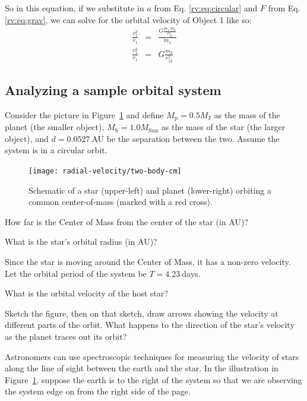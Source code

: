 So in this equation, if we substitute in $a$ from Eq. \ref{rv:eq:circular} and $F$ from Eq. \ref{rv:eq:grav}, we can solve for the orbital velocity of Object 1 like so:
\begin{eqnarray}
 \frac{v_1^2}{r_1} &=& \frac{G \frac{m_1 \: m_2}{r_{12}^2}}{m_1} \\
 \frac{v_1^2}{r_1} &=& G \frac{m_2}{r_{12}^2}
\end{eqnarray}

\subsection{Analyzing a sample orbital system}

Consider the picture in Figure~\ref{rv:fig:two-body-cm} and define $M_\textrm{p} = 0.5 M_\textrm{J}$ as the mass of the planet (the smaller object),  $M_\textrm{S} = 1.0 M_\textrm{Sun}$ as the mass of the star (the larger object), and $d = 0.0527\:$AU be the separation between the two. Assume the system is in a circular orbit.

\begin{figure}
	\centering
	\texttt{[image: radial-velocity/two-body-cm]}
	\caption{Schematic of a star (upper-left) and planet (lower-right) orbiting a common center-of-mass (marked with a red cross).}\label{rv:fig:two-body-cm}
\end{figure}

\begin{steps}
	\item How far is the Center of Mass from the center of the star (in AU)?
	
	\item What is the star’s orbital radius (in AU)?
\end{steps}

Since the star is moving around the Center of Mass, it has a non-zero velocity. Let the orbital period of the system be $T = 4.23\:$days.

\begin{steps}
	\item What is the orbital velocity of the host star?
	
	\item Sketch the figure, then on that sketch, draw arrows showing the velocity at different parts of the orbit. What happens to the direction of the star’s velocity as the planet traces out its orbit?
\end{steps}

Astronomers can use spectroscopic techniques for measuring the velocity of stars along the line of sight between the earth and the star. In the illustration in Figure~\ref{rv:fig:two-body-cm}, suppose the earth is to the right of the system so that we are observing the system edge on from the right side of the page. 


